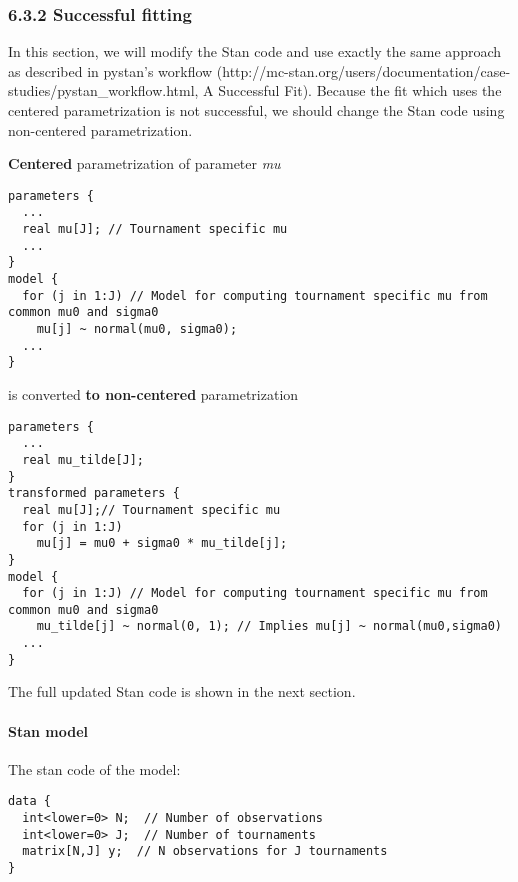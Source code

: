 \documentclass[11pt]{article}
\begin{document}
    \hypertarget{successful-fitting}{%
\subsubsection{6.3.2 Successful fitting}\label{successful-fitting}}

In this section, we will modify the Stan code and use exactly the same
approach as described in pystan's workflow
(http://mc-stan.org/users/documentation/case-studies/pystan\_workflow.html,
A Successful Fit). Because the fit which uses the centered
parametrization is not successful, we should change the Stan code using
non-centered parametrization.

\textbf{Centered} parametrization of parameter \emph{mu}

\begin{verbatim}
parameters {
  ...
  real mu[J]; // Tournament specific mu
  ...
}
model {
  for (j in 1:J) // Model for computing tournament specific mu from common mu0 and sigma0
    mu[j] ~ normal(mu0, sigma0);
  ...
}
\end{verbatim}

is converted \textbf{to non-centered} parametrization

\begin{verbatim}
parameters {
  ...
  real mu_tilde[J];
}
transformed parameters {
  real mu[J];// Tournament specific mu
  for (j in 1:J)
    mu[j] = mu0 + sigma0 * mu_tilde[j];
}
model {
  for (j in 1:J) // Model for computing tournament specific mu from common mu0 and sigma0
    mu_tilde[j] ~ normal(0, 1); // Implies mu[j] ~ normal(mu0,sigma0)
  ...
}
\end{verbatim}

The full updated Stan code is shown in the next section.

\hypertarget{stan-model}{%
\paragraph{Stan model}\label{stan-model}}

The stan code of the model:

\begin{verbatim}
data {
  int<lower=0> N;  // Number of observations
  int<lower=0> J;  // Number of tournaments
  matrix[N,J] y;  // N observations for J tournaments
}
\end{verbatim}
\end{document}
